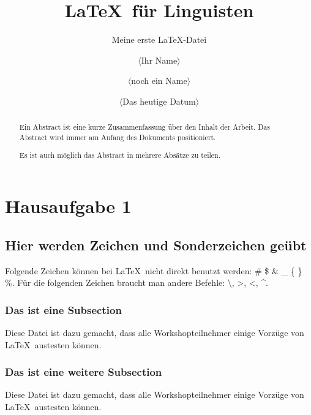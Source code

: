 \documentclass[10pt,paper=a4,abstracton]{scrartcl}
\begin{document}
\author{$\langle$Ihr Name$\rangle$ \and $\langle$noch ein Name$\rangle$}
\title{\LaTeX\ für Linguisten}
\subtitle{Meine erste \LaTeX -Datei}
\date{$\langle$Das heutige Datum$\rangle$}

\maketitle

\begin{abstract}
	Ein Abstract ist eine kurze Zusammenfassung über den Inhalt 
	der Arbeit. Das Abstract wird immer am Anfang des Dokuments 
	positioniert.\par
	Es ist auch möglich das Abstract in mehrere Absätze
	zu teilen.
\end{abstract}

\tableofcontents


\section{Hausaufgabe 1}


\subsection[Zeichen und Sonderzeichen]{Hier werden Zeichen und Sonderzeichen geübt}

Folgende Zeichen können bei \LaTeX\ nicht direkt benutzt werden: \# \$ \& \_ \{ \} \%. Für die folgenden Zeichen braucht man andere Befehle: \textbackslash, \textgreater , \textless , \textasciicircum .


\subsubsection[Erste Subsection]{Das ist eine Subsection}

Diese Datei ist dazu gemacht, dass alle Workshopteilnehmer einige Vorzüge von \LaTeX\ austesten können.


\subsubsection[Zweite Subsection]{Das ist eine weitere Subsection}

Diese Datei ist dazu gemacht, dass alle Workshopteilnehmer einige Vorzüge von \LaTeX\ austesten können.
\end{document}
